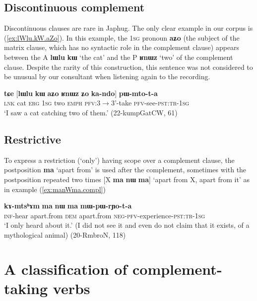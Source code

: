 \documentclass[oneside,a4paper,11pt]{article}
\newcommand{\ipa}[1]{\textbf{\phon#1}} %
\begin{document}
\subsection{Discontinuous complement} 

Discontinuous clauses are rare in Japhug. The only clear example in our corpus is (\ref{ex:lWlu.kW.aZo}). In this example, the \textsc{1sg} pronoun \ipa{aʑo} (the subject of the matrix clause, which has no syntactic role in the complement clause) appears between the A \ipa{lɯlu} 	\ipa{kɯ} `the cat' and the P \ipa{ʁnɯz} `two' of the complement clause. Despite the rarity of this construction, this sentence was not considered to be unusual by our consultant when listening again to the recording.
 
 \begin{exe}
\ex \label{ex:lWlu.kW.aZo}
\gll \ipa{tɕe} 	[\ipa{lɯlu} 	\ipa{kɯ} 	\ipa{aʑo} 	\ipa{ʁnɯz} 	\ipa{ʑo} 	\ipa{ka-ndo}] 	\ipa{pɯ-mto-t-a} \\
\textsc{lnk} cat \textsc{erg} \textsc{1sg} two \textsc{emph} \textsc{pfv}:3$\rightarrow$3'-take \textsc{pfv}-see-\textsc{pst:tr-1sg} \\
\glt `I saw a cat catching two of them.' (22-kumpGatCW, 61)
\end{exe}
 
\subsection{Restrictive} 
To express a restriction (`only') having scope over a complement clause, the postposition \ipa{ma} `apart from' is used after the complement, sometimes with the postposition repeated two times [X \ipa{ma} \ipa{nɯ} \ipa{ma}] `apart from X, apart from it' as in example (\ref{ex:manWma.compl})

\begin{exe}
\ex \label{ex:manWma.compl}
\gll \ipa{kɤ-mtsʰɤm} 	\ipa{ma} 	\ipa{nɯ} 	\ipa{ma} 	\ipa{mɯ-pɯ-rɲo-t-a} \\
\textsc{inf}-hear apart.from \textsc{dem} apart.from \textsc{neg-pfv}-experience-\textsc{pst:tr-1sg} \\
\glt `I only heard about it.' (I did not see it and even do not claim that it exists, of a mythological animal) (20-RmbroN, 118)
\end{exe}
 
  \section{A classification of complement-taking verbs} 
\end{document}
